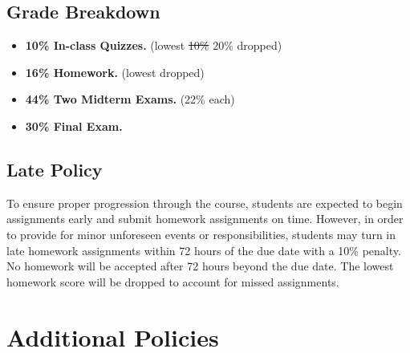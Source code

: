 \documentclass[9pt]{article}
\begin{document}
\subsection*{Grade Breakdown}

\begin{itemize}[noitemsep]
    \item \textbf{10\% In-class Quizzes.} (lowest \sout{10\%} 20\% dropped)
    \item \textbf{16\% Homework.} (lowest dropped)
    \item \textbf{44\% Two Midterm Exams.} (22\% each)
    \item \textbf{30\% Final Exam.}
\end{itemize}

\subsection*{Late Policy}

To ensure proper progression through the course, students are expected to begin assignments early and submit homework assignments on time. However, in order to provide for minor unforeseen events or responsibilities, students may turn in late homework assignments within 72 hours of the due date with a 10\% penalty. No homework will be accepted after 72 hours beyond the due date. The lowest homework score will be dropped to account for missed assignments.

\section*{Additional Policies}

{\small
    
}
\end{document}
